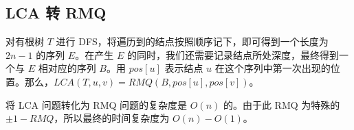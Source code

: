 \subsection{LCA 转 RMQ}
	对有根树 $T$ 进行 DFS，将遍历到的结点按照顺序记下，即可得到一个长度为 $2n-1$ 的序列 $E$。在产生 $E$ 的同时，我们还需要记录结点所处深度，最终得到一个与 $E$ 相对应的序列 $B$。用 $pos[u]$ 表示结点 $u$ 在这个序列中第一次出现的位置。那么，$LCA(T,u,v)=RMQ(B,pos[u],pos[v])$。
	
	将 LCA 问题转化为 RMQ 问题的复杂度是 $O(n)$ 的。由于此 RMQ 为特殊的 $\pm 1-RMQ$，所以最终的时间复杂度为 $O(n)-O(1)$。